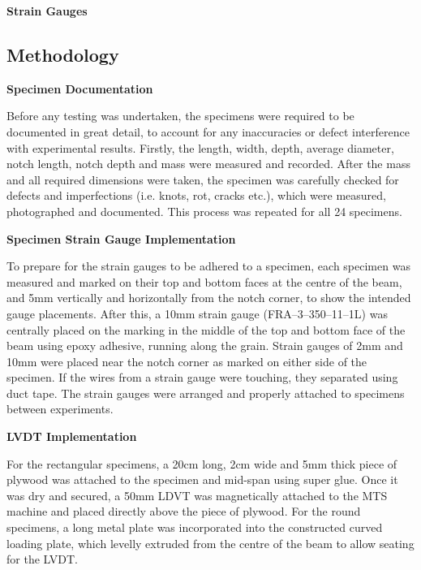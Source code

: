 \documentclass[11pt,a4paper]{article}
\numberwithin{equation}{subsection}
\begin{document}
\vspace*{\baselineskip}
\noindent \textbf{Strain Gauges}\par

\subsection{Methodology}

\textbf{Specimen Documentation}\par
\noindent
Before any testing was undertaken, the specimens were required to be documented in great detail, to account for any inaccuracies or defect interference with experimental results. Firstly, the length, width, depth, average diameter, notch length, notch depth and mass were measured and recorded. After the mass and all required dimensions were taken, the specimen was carefully checked for defects and imperfections (i.e. knots, rot, cracks etc.), which were measured, photographed and documented. This process was repeated for all 24 specimens. 

\vspace*{\baselineskip}

\textbf{Specimen Strain Gauge Implementation}\par
\noindent
To prepare for the strain gauges to be adhered to a specimen, each specimen was measured and marked on their top and bottom faces at the centre of the beam, and 5mm vertically and horizontally from the notch corner, to show the intended gauge placements. After this, a 10mm strain gauge (FRA--3--350--11--1L) was centrally placed on the marking in the middle of the top and bottom face of the beam using epoxy adhesive, running along the grain. Strain gauges of 2mm and 10mm were placed near the notch corner as marked on either side of the specimen. If the wires from a strain gauge were touching, they separated using duct tape. The strain gauges were arranged and properly attached to specimens between experiments.

\vspace*{\baselineskip}

\textbf{LVDT Implementation}\par
\noindent
For the rectangular specimens, a 20cm long, 2cm wide and 5mm thick piece of plywood was attached to the specimen and mid-span using super glue. Once it was dry and secured, a 50mm LDVT was magnetically attached to the MTS machine and placed directly above the piece of plywood. For the round specimens, a long metal plate was incorporated into the constructed curved loading plate, which levelly extruded from the centre of the beam to allow seating for the LVDT.
\end{document}
